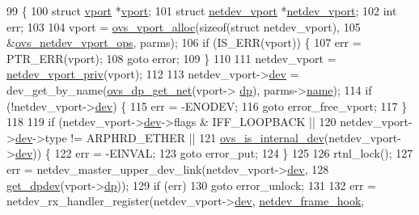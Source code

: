 \begin{DoxyCode}
99 \{
100     \textcolor{keyword}{struct }\hyperlink{structvport}{vport} *\hyperlink{structvport}{vport};
101     \textcolor{keyword}{struct }\hyperlink{structnetdev__vport}{netdev\_vport} *\hyperlink{structnetdev__vport}{netdev\_vport};
102     \textcolor{keywordtype}{int} err;
103 
104     vport = \hyperlink{linux_2vport_8c_a9198ee06111592d2cf6c3b2bf94561c1}{ovs\_vport\_alloc}(\textcolor{keyword}{sizeof}(\textcolor{keyword}{struct} netdev\_vport),
105                 &\hyperlink{vport-netdev_8c_a881cb730847416574c9c4b3b7c4c3003}{ovs\_netdev\_vport\_ops}, parms);
106     \textcolor{keywordflow}{if} (IS\_ERR(vport)) \{
107         err = PTR\_ERR(vport);
108         \textcolor{keywordflow}{goto} error;
109     \}
110 
111     netdev\_vport = \hyperlink{vport-netdev_8h_a2cb441c6cf067ce3c79cb43836e9fc55}{netdev\_vport\_priv}(vport);
112 
113     netdev\_vport->\hyperlink{structnetdev__vport_acf4ee248f7385e2f987fd2736f824ca9}{dev} = dev\_get\_by\_name(\hyperlink{datapath_8h_aef2302004ca1f45133eaef00bb3740eb}{ovs\_dp\_get\_net}(vport->
      \hyperlink{structvport_a49fb6f6bf0ac4337853e9242e88ddc42}{dp}), parms->\hyperlink{structvport__parms_a4f27e2a7b7dc0493c095cdaabe225b38}{name});
114     \textcolor{keywordflow}{if} (!netdev\_vport->\hyperlink{structnetdev__vport_acf4ee248f7385e2f987fd2736f824ca9}{dev}) \{
115         err = -ENODEV;
116         \textcolor{keywordflow}{goto} error\_free\_vport;
117     \}
118 
119     \textcolor{keywordflow}{if} (netdev\_vport->\hyperlink{structnetdev__vport_acf4ee248f7385e2f987fd2736f824ca9}{dev}->flags & IFF\_LOOPBACK ||
120         netdev\_vport->\hyperlink{structnetdev__vport_acf4ee248f7385e2f987fd2736f824ca9}{dev}->type != ARPHRD\_ETHER ||
121         \hyperlink{linux_2vport-internal__dev_8c_a2056d15823f88a4caeb90001bce724bb}{ovs\_is\_internal\_dev}(netdev\_vport->\hyperlink{structnetdev__vport_acf4ee248f7385e2f987fd2736f824ca9}{dev})) \{
122         err = -EINVAL;
123         \textcolor{keywordflow}{goto} error\_put;
124     \}
125 
126     rtnl\_lock();
127     err = netdev\_master\_upper\_dev\_link(netdev\_vport->\hyperlink{structnetdev__vport_acf4ee248f7385e2f987fd2736f824ca9}{dev},
128                        \hyperlink{vport-netdev_8c_ae407cdb3541e622199306fa8e2e6cd92}{get\_dpdev}(vport->\hyperlink{structvport_a49fb6f6bf0ac4337853e9242e88ddc42}{dp}));
129     \textcolor{keywordflow}{if} (err)
130         \textcolor{keywordflow}{goto} error\_unlock;
131 
132     err = netdev\_rx\_handler\_register(netdev\_vport->\hyperlink{structnetdev__vport_acf4ee248f7385e2f987fd2736f824ca9}{dev}, \hyperlink{vport-netdev_8c_a4c69c350d93bf290fea2ff1e9759311d}{netdev\_frame\_hook},

\end{DoxyCode}

